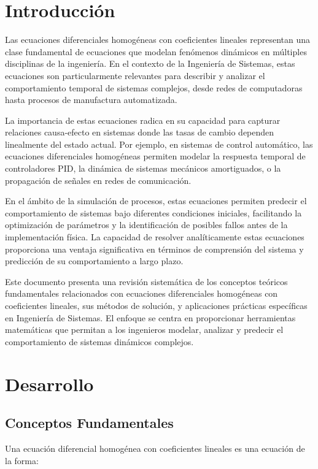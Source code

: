 \documentclass[12pt]{article}
\begin{document}
\section{Introducción}

Las ecuaciones diferenciales homogéneas con coeficientes lineales representan una clase fundamental de ecuaciones que modelan fenómenos dinámicos en múltiples disciplinas de la ingeniería. En el contexto de la Ingeniería de Sistemas, estas ecuaciones son particularmente relevantes para describir y analizar el comportamiento temporal de sistemas complejos, desde redes de computadoras hasta procesos de manufactura automatizada.

La importancia de estas ecuaciones radica en su capacidad para capturar relaciones causa-efecto en sistemas donde las tasas de cambio dependen linealmente del estado actual. Por ejemplo, en sistemas de control automático, las ecuaciones diferenciales homogéneas permiten modelar la respuesta temporal de controladores PID, la dinámica de sistemas mecánicos amortiguados, o la propagación de señales en redes de comunicación.

En el ámbito de la simulación de procesos, estas ecuaciones permiten predecir el comportamiento de sistemas bajo diferentes condiciones iniciales, facilitando la optimización de parámetros y la identificación de posibles fallos antes de la implementación física. La capacidad de resolver analíticamente estas ecuaciones proporciona una ventaja significativa en términos de comprensión del sistema y predicción de su comportamiento a largo plazo.

Este documento presenta una revisión sistemática de los conceptos teóricos fundamentales relacionados con ecuaciones diferenciales homogéneas con coeficientes lineales, sus métodos de solución, y aplicaciones prácticas específicas en Ingeniería de Sistemas. El enfoque se centra en proporcionar herramientas matemáticas que permitan a los ingenieros modelar, analizar y predecir el comportamiento de sistemas dinámicos complejos.

\section{Desarrollo}

\subsection{Conceptos Fundamentales}

Una ecuación diferencial homogénea con coeficientes lineales es una ecuación de la forma:
\end{document}

